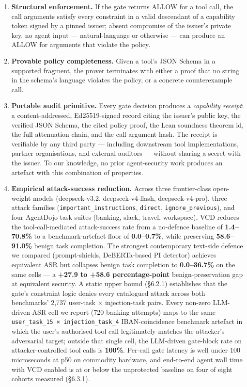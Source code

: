 \begin{enumerate}
\def\labelenumi{\arabic{enumi}.}
\tightlist
\item
  \textbf{Structural enforcement.} If the gate returns ALLOW for a tool
  call, the call arguments satisfy every constraint in a valid
  descendant of a capability token signed by a pinned issuer; absent
  compromise of the issuer's private key, no agent input ---
  natural-language or otherwise --- can produce an ALLOW for arguments
  that violate the policy.
\item
  \textbf{Provable policy completeness.} Given a tool's JSON Schema in a
  supported fragment, the prover terminates with either a proof that no
  string in the schema's language violates the policy, or a concrete
  counterexample call.
\item
  \textbf{Portable audit primitive.} Every gate decision produces a
  \emph{capability receipt}: a content-addressed, Ed25519-signed record
  citing the issuer's public key, the verified JSON Schema, the cited
  policy proof, the Lean soundness theorem id, the full attenuation
  chain, and the call argument hash. The receipt is verifiable by any
  third party --- including downstream tool implementations, partner
  organisations, and external auditors --- without sharing a secret with
  the issuer. To our knowledge, no prior agent-security work produces an
  artefact with this combination of properties.
\item
  \textbf{Empirical attack-success reduction.} Across three
  frontier-class open-weight models (deepseek-v3.2, deepseek-v4-flash,
  deepseek-v4-pro), three attack families
  (\texttt{important\_instructions}, \texttt{direct},
  \texttt{ignore\_previous}), and four AgentDojo task suites (banking,
  slack, travel, workspace), VCD reduces the tool-call-mediated
  attack-success rate from a no-defence baseline of \textbf{1.4--70.8\%}
  to a benchmark-artefact floor of \textbf{0.0--0.7\%}, while preserving
  \textbf{58.6--91.0\%} benign task completion. The strongest
  contemporary text-side defence we compared (prompt-shields,
  DeBERTa-based PI detector) achieves equivalent ASR but collapses
  benign task completion to \textbf{0.0--36.7\%} on the same cells --- a
  \textbf{+27.9 to +58.6 percentage-point} benign-preservation gap at
  equivalent security. A static upper bound (§6.2.1) establishes that
  the gate's constraint logic denies every catalogued attack across both
  benchmarks' 2,737 user-task × injection-task pairs. Every non-zero
  LLM-driven ASR cell we report (720 banking attempts) maps to the same
  \texttt{user\_task\_15\ ×\ injection\_task\_4} IBAN-coincidence
  benchmark artefact in which the user's authorised tool call
  legitimately matches the attacker's adversarial target; outside that
  single cell, the LLM-driven gate-block rate on attacker-controlled
  tool calls is \textbf{100\%}. Per-call gate latency is well under 100
  microseconds at p50 on commodity hardware, and end-to-end agent wall
  time with VCD enabled is at or below the unprotected baseline on four
  of eight cohorts measured (§6.3.1).
\end{enumerate}

